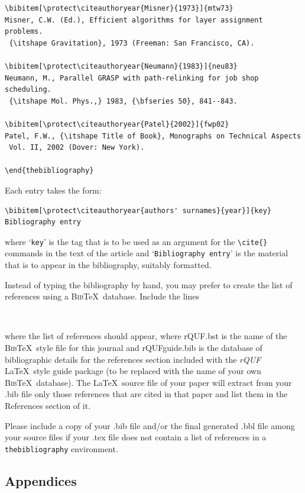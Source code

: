 \documentclass{rQUF2e}
\theoremstyle{plain}
\theoremstyle{definition}
\theoremstyle{remark}
\begin{document}
\begin{verbatim}
\bibitem[\protect\citeauthoryear{Misner}{1973}]{mtw73}
Misner, C.W. (Ed.), Efficient algorithms for layer assignment problems.
 {\itshape Gravitation}, 1973 (Freeman: San Francisco, CA).

\bibitem[\protect\citeauthoryear{Neumann}{1983}]{neu83}
Neumann, M., Parallel GRASP with path-relinking for job shop scheduling.
 {\itshape Mol. Phys.,} 1983, {\bfseries 50}, 841--843.

\bibitem[\protect\citeauthoryear{Patel}{2002}]{fwp02}
Patel, F.W., {\itshape Title of Book}, Monographs on Technical Aspects
 Vol. II, 2002 (Dover: New York).

\end{thebibliography}
\end{verbatim}
\medskip
\noindent Each entry takes the form:
\begin{verbatim}
\bibitem[\protect\citeauthoryear{authors' surnames}{year}]{key}
Bibliography entry
\end{verbatim}
where `\texttt{key}' is the tag that is to be used as an argument for the \verb"\cite{}" commands in the text of the article
and `\texttt{Bibliography entry}' is the material that is to appear in the bibliography, suitably formatted.

Instead of typing the bibliography by hand, you may prefer to create the list of references using a \textsc{Bib}\TeX\ database. Include the lines
\begin{verbatim}


\end{verbatim}
where the list of references should appear, where rQUF.bst is the name of the \textsc{Bib}\TeX\ style file for this journal and rQUFguide.bib is the database of bibliographic details for the references section included with the \textit{rQUF} \LaTeX\ style guide package (to be replaced with the name of your own \textsc{Bib}\TeX\ database). The \LaTeX\ source file of your paper will extract from your .bib file only those references that are cited in that paper and list them in the References section of it.

Please include a copy of your .bib file and/or the final generated .bbl file among your source files if your .tex file does not contain a list of references in a \texttt{thebibliography} environment.


\subsection{Appendices}
\end{document}
